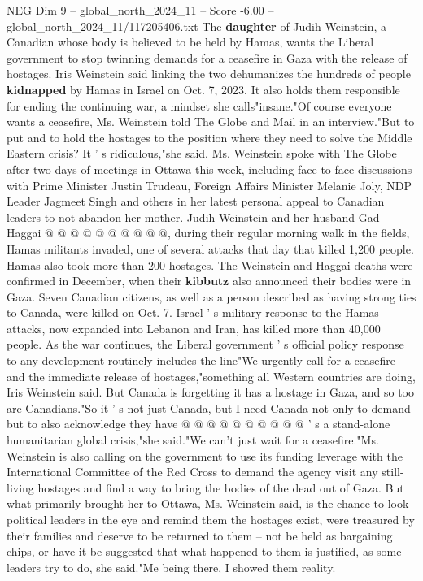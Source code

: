 \begin{textsample}{NEG Dim 9 – global\_north\_2024\_11 – Score -6.00 – global\_north\_2024\_11/117205406.txt}  \label{ex:f9_neg_204}
The \textbf{daughter} of Judih Weinstein, a Canadian whose body is believed to be held by Hamas, wants the Liberal government to stop twinning demands for a ceasefire in Gaza with the release of hostages.
Iris Weinstein said linking the two dehumanizes the hundreds of people \textbf{kidnapped} by Hamas in Israel on Oct. 7, 2023.
It also holds them responsible for ending the continuing war, a mindset she calls"insane."Of course everyone wants a ceasefire, Ms.
Weinstein told The Globe and Mail in an interview."But to put and to hold the hostages to the position where they need to solve the Middle Eastern crisis?
It ' s ridiculous,"she said.
Ms.
Weinstein spoke with The Globe after two days of meetings in Ottawa this week, including face-to-face discussions with Prime Minister Justin Trudeau, Foreign Affairs Minister Melanie Joly, NDP Leader Jagmeet Singh and others in her latest personal appeal to Canadian leaders to not abandon her mother.
Judih Weinstein and her husband Gad Haggai @ @ @ @ @ @ @ @ @ @, during their regular morning walk in the fields, Hamas militants invaded, one of several attacks that day that killed 1,200 people.
Hamas also took more than 200 hostages.
The Weinstein and Haggai deaths were confirmed in December, when their \textbf{kibbutz} also announced their bodies were in Gaza.
Seven Canadian citizens, as well as a person described as having strong ties to Canada, were killed on Oct. 7.
Israel ' s military response to the Hamas attacks, now expanded into Lebanon and Iran, has killed more than 40,000 people.
As the war continues, the Liberal government ' s official policy response to any development routinely includes the line"We urgently call for a ceasefire and the immediate release of hostages,"something all Western countries are doing, Iris Weinstein said.
But Canada is forgetting it has a hostage in Gaza, and so too are Canadians."So it ' s not just Canada, but I need Canada not only to demand but to also acknowledge they have @ @ @ @ @ @ @ @ @ @ ' s a stand-alone humanitarian global crisis,"she said."We can't just wait for a ceasefire."Ms.
Weinstein is also calling on the government to use its funding leverage with the International Committee of the Red Cross to demand the agency visit any still-living hostages and find a way to bring the bodies of the dead out of Gaza.
But what primarily brought her to Ottawa, Ms.
Weinstein said, is the chance to look political leaders in the eye and remind them the hostages exist, were treasured by their families and deserve to be returned to them -- not be held as bargaining chips, or have it be suggested that what happened to them is justified, as some leaders try to do, she said."Me being there, I showed them reality.

\end{textsample}
